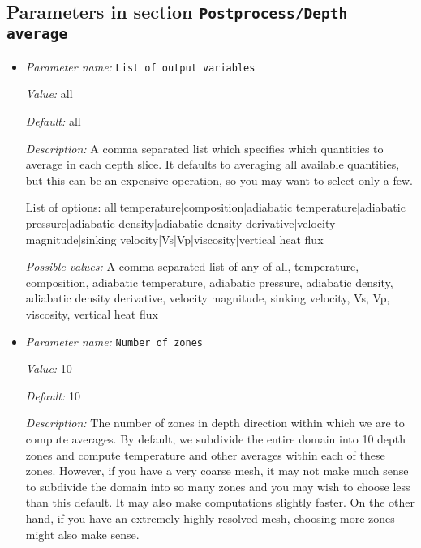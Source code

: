 \subsection{Parameters in section \tt Postprocess/Depth average}
\label{parameters:Postprocess/Depth_20average}

\begin{itemize}
\item {\it Parameter name:} {\tt List of output variables}
\label{parameters:Postprocess/Depth average/List of output variables}


{\it Value:} all


{\it Default:} all


{\it Description:} A comma separated list which specifies which quantities to average in each depth slice. It defaults to averaging all available quantities, but this can be an expensive operation, so you may want to select only a few.

List of options:
all|temperature|composition|adiabatic temperature|adiabatic pressure|adiabatic density|adiabatic density derivative|velocity magnitude|sinking velocity|Vs|Vp|viscosity|vertical heat flux


{\it Possible values:} A comma-separated list of any of all, temperature, composition, adiabatic temperature, adiabatic pressure, adiabatic density, adiabatic density derivative, velocity magnitude, sinking velocity, Vs, Vp, viscosity, vertical heat flux
\item {\it Parameter name:} {\tt Number of zones}
\label{parameters:Postprocess/Depth average/Number of zones}


{\it Value:} 10


{\it Default:} 10


{\it Description:} The number of zones in depth direction within which we are to compute averages. By default, we subdivide the entire domain into 10 depth zones and compute temperature and other averages within each of these zones. However, if you have a very coarse mesh, it may not make much sense to subdivide the domain into so many zones and you may wish to choose less than this default. It may also make computations slightly faster. On the other hand, if you have an extremely highly resolved mesh, choosing more zones might also make sense.



\end{itemize}
